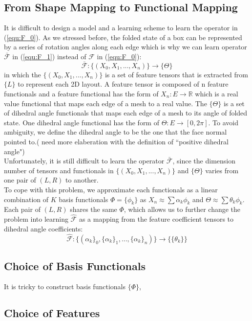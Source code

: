\subsection{From Shape Mapping to Functional Mapping}
It is difficult to design a model and a learning scheme to learn the operator in (\ref{equ:F_0}). As we stressed before, the folded state of a box can be represented by a series of rotation angles along each edge which is why we can learn operator $\mathcal{\bar{F}}$ in (\ref{equ:F_1}) instead of $\mathcal{F}$ in (\ref{equ:F_0}):
\begin{equation}
\mathcal{\bar{F}}:\{(X_0,X_1,...,X_n)\}\rightarrow\{\Theta\}
\label{equ:F_1}
\end{equation}
in which the $\{(X_0,X_1,...,X_n)\}$ is a set of feature tensors that is extracted from $\{L\}$ to represent each 2D layout. A feature tensor is composed of n feature functionals and a feature functional has the form of $X_n:E\rightarrow\mathbb{R}$ which is a real value functional that maps each edge of a mesh to a real value. The $\{\Theta\}$ is a set of dihedral angle functionals that maps each edge of a mesh to its angle of folded state. One dihedral angle functional has the form of $\Theta:E\rightarrow [0,2\pi]$. To avoid ambiguity, we define the dihedral angle to be the one that the face normal pointed to.({\color{red} {need more elaberation with the definition of ``positive dihedral angle"}})\\
Unfortunately, it is still difficult to learn the operator $\mathcal{\bar{F}}$, since the dimension number of tensors and functionals in $\{(X_0,X_1,...,X_n)\}$ and $\{\Theta\}$ varies from one pair of $(L,R)$ to another.\\
To cope with this problem, we approximate each functionals as a linear combination of $K$ basis functionals $\Phi = \{\phi_k\}$ as $X_n \approx \sum \alpha_k \phi_k$  and $\Theta \approx \sum \theta_k \phi_k$. Each pair of $(L,R)$ shares the same $\Phi$, which allows us to further change the problem into learning $\mathcal{\hat{F}}$ as a mapping from the feature coefficient tensors to dihedral angle coefficients:
\begin{equation}
\mathcal{\hat{F}}:\{(\alpha_k\}_0,\{\alpha_k\}_1,...,\{\alpha_k\}_n)\}\rightarrow\{\{\theta_k\}\}
\label{equ:F_2}
\end{equation}
\subsection{Choice of Basis Functionals}
It is tricky to construct basis functionals $\{\Phi\}$, 
\subsection{Choice of Features}
